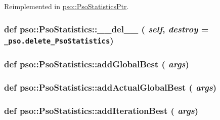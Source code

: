 Reimplemented in \hyperlink{classpso_1_1PsoStatisticsPtr_340c20923b9f481d88185dc3977364aa}{pso::PsoStatisticsPtr}.\hypertarget{classpso_1_1PsoStatistics_b872eaee3a5d4cf6d17329d66026376f}{
\subsubsection{\setlength{\rightskip}{0pt plus 5cm}def pso::PsoStatistics::\_\-\_\-del\_\-\_\- ( {\em self}, \/   {\em destroy} = {\tt \_\-pso.delete\_\-PsoStatistics})}}
\label{classpso_1_1PsoStatistics_b872eaee3a5d4cf6d17329d66026376f}


\hypertarget{classpso_1_1PsoStatistics_9efa2773213fe1dd5814325ee1da52e2}{
\subsubsection{\setlength{\rightskip}{0pt plus 5cm}def pso::PsoStatistics::addGlobalBest ( {\em args})}}
\label{classpso_1_1PsoStatistics_9efa2773213fe1dd5814325ee1da52e2}


\hypertarget{classpso_1_1PsoStatistics_63cd49a545868fa865767746772095b5}{
\subsubsection{\setlength{\rightskip}{0pt plus 5cm}def pso::PsoStatistics::addActualGlobalBest ( {\em args})}}
\label{classpso_1_1PsoStatistics_63cd49a545868fa865767746772095b5}


\hypertarget{classpso_1_1PsoStatistics_235a7e312e793be9f08bb031f09900f1}{
\subsubsection{\setlength{\rightskip}{0pt plus 5cm}def pso::PsoStatistics::addIterationBest ( {\em args})}}
\label{classpso_1_1PsoStatistics_235a7e312e793be9f08bb031f09900f1}


